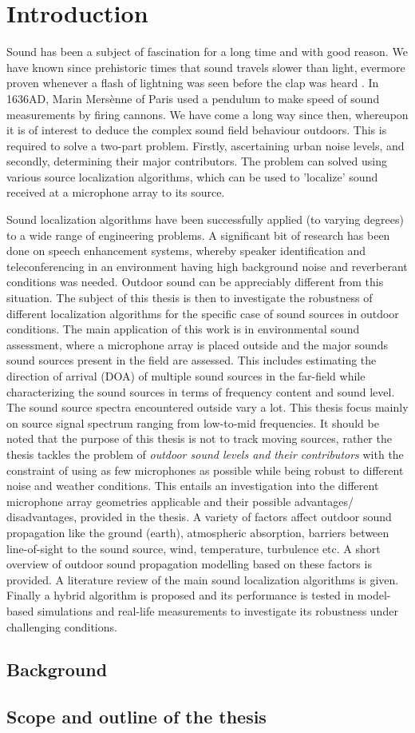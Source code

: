 \section{Introduction}

Sound has been a subject of fascination for a long time and with good reason. We have known since prehistoric times that sound travels slower than light, evermore proven whenever a flash of lightning was seen before the clap was heard \cite{ampel1993history}.  In 1636AD, Marin Mersènne of Paris used a pendulum to make speed of sound measurements by firing cannons. We have come a long way since then, whereupon it is of interest to deduce the complex sound field behaviour outdoors. This is required to solve a two-part problem. Firstly, ascertaining urban noise levels, and secondly, determining their major contributors. The problem can solved using various source localization algorithms, which can be used to 'localize' sound received at a microphone array to its source.

Sound localization algorithms have been successfully applied (to varying degrees) to a wide range of engineering problems. A significant bit of research has been done on speech enhancement systems, whereby speaker identification and teleconferencing in an environment having high background noise and reverberant conditions was needed. Outdoor sound can be appreciably different from this situation. The subject of this thesis is then to investigate the robustness of different localization algorithms for the specific case of sound sources in outdoor conditions. The main application of this work is in environmental sound assessment, where a microphone array is placed outside and the major sounds sound sources present in the field are assessed. This includes estimating the direction of arrival (DOA) of multiple sound sources in the far-field while characterizing the sound sources in terms of frequency content and sound level. The sound source spectra encountered outside vary a lot. This thesis focus mainly on source signal spectrum ranging from low-to-mid frequencies. It should be noted that the purpose of this thesis is not to track moving sources, rather the thesis tackles the problem of \textit{outdoor sound levels and their contributors} with the constraint of using as few microphones as possible while being robust to different noise and weather conditions. This entails an investigation into the different microphone array geometries applicable and their possible advantages/ disadvantages, provided in the thesis. A variety of factors affect outdoor sound propagation like the ground (earth), atmospheric absorption, barriers between line-of-sight to the sound source, wind, temperature, turbulence etc. A short overview of outdoor sound propagation modelling based on these factors is provided. A literature review of the main sound localization algorithms is given. Finally a hybrid algorithm is proposed and its performance is tested in model-based simulations and real-life measurements to investigate its robustness under challenging conditions.


\subsection{Background}

\subsection{Scope and outline of the thesis}

